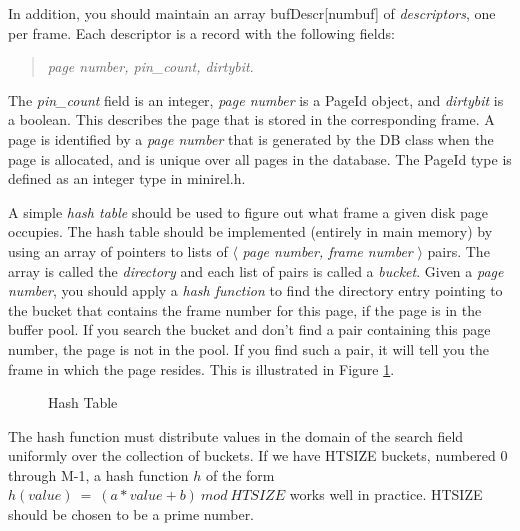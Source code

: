 In addition, you should maintain an array bufDescr[numbuf] of 
{\em descriptors}, one per frame.  Each descriptor is a record with 
the following fields:
\begin{quote}
{\em page number, pin\_count, dirtybit}.
\end{quote}
The {\em pin\_count} field is an
integer, {\em page number} is a PageId object, and {\em dirtybit}  
is a boolean. This describes the page that is stored in the corresponding frame.
A page is identified by
a {\em page number} that is
generated by the DB class when the page is allocated, and is unique over all
pages in the database. 
The PageId type is defined as an integer type in minirel.h.

A simple {\em hash table} should be used to figure out 
what frame a given disk page occupies.  
The hash table should be implemented (entirely in main memory)
by using an array of pointers to lists of
$\langle$ {\em page number, frame number} $\rangle$ pairs.  
The array is called the {\em directory} and each list of
pairs is called a {\em bucket}.  Given a {\em page number}, you
should apply a {\em hash function} to find the directory entry
pointing to the bucket that contains the frame number for this page, if the
page is in the buffer pool.  If you search the bucket and don't find
a pair containing this page number, the page is not in the pool.
If you find such a pair, it will tell you the frame in which the page
resides.  This is illustrated in Figure \ref{assign1fig}.

\begin{figure}
\centerline{}
\caption{Hash Table}\label{assign1fig}
\end{figure}

The hash function
must distribute values in the domain of the search field
uniformly over the collection of buckets.
If we have HTSIZE buckets, numbered 0 through M-1, a hash
function $h$ of the form $h(value)~=~(a*value+b)~mod~HTSIZE$
works well in practice.  HTSIZE should be chosen to be a prime number.

